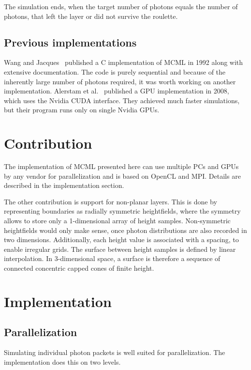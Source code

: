 \documentclass[]{article}
\begin{document}
The simulation ends, when the target number of photons equals the number of photons, that left the layer or did not survive the roulette.

\subsection{Previous implementations}

Wang and Jacques~\cite{wang1992monte} published a C implementation of MCML in 1992 along with extensive documentation. The code is purely sequential and because of the inherently large number of photons required, it was worth working on another implementation. Alerstam et al.~\cite{alerstam2008parallel} published a GPU implementation in 2008, which uses the Nvidia CUDA interface. They achieved much faster simulations, but their program runs only on single Nvidia GPUs.

\section{Contribution}

The implementation of MCML presented here can use multiple PCs and GPUs by any vendor for parallelization and is based on OpenCL and MPI. Details are described in the implementation section.

The other contribution is support for non-planar layers. This is done by representing boundaries as radially symmetric heightfields, where the symmetry allows to store only a 1-dimensional array of height samples. Non-symmetric heightfields would only make sense, once photon distributions are also recorded in two dimensions. Additionally, each height value is associated with a spacing, to enable irregular grids. The surface between height samples is defined by linear interpolation. In 3-dimensional space, a surface is therefore a sequence of connected concentric capped cones of finite height.

\section{Implementation}

\subsection{Parallelization}

Simulating individual photon packets is well suited for parallelization. The implementation does this on two levels.
\end{document}
